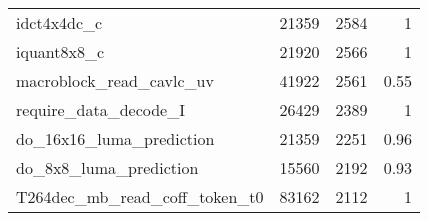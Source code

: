 \begin{longtable}[\textwidth]{lrrr}
    idct4x4dc\_c				&	21359	&	2584 	&	1		\\ \rowcolor{gray!15}
    iquant8x8\_c				&	21920	&	2566 	&	1		\\
    macroblock\_read\_cavlc\_uv	
    							&	41922	&	2561 	&	0.55	\\ \rowcolor{gray!15}
    require\_data\_decode\_I	&	26429	&	2389 	&	1		\\
    do\_16x16\_luma\_prediction	
    							&	21359	&	2251 	&	0.96	\\ \rowcolor{gray!15}
    do\_8x8\_luma\_prediction	&	15560	&	2192 	&	0.93	\\
    T264dec\_mb\_read\_coff\_token\_t0	
    							&	83162	&	2112 	&	1		\\
    \bottomrule[1.5pt]
\end{longtable}

